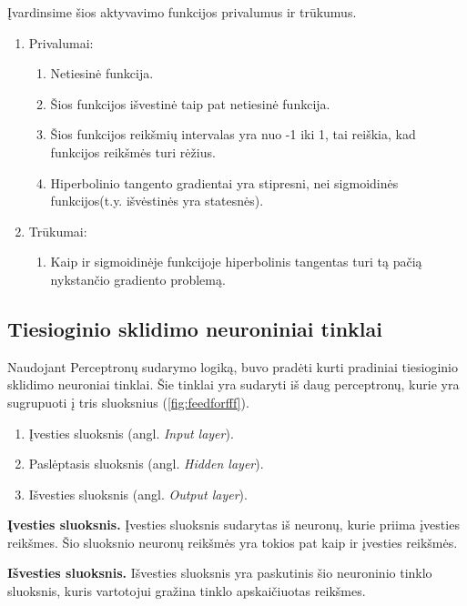 Įvardinsime šios aktyvavimo funkcijos privalumus ir trūkumus. \cite{Avinash2017}
\begin{enumerate}
  \item Privalumai:
    \begin{enumerate}
      \item Netiesinė funkcija.
      \item Šios funkcijos išvestinė taip pat netiesinė funkcija.
      \item Šios funkcijos reikšmių intervalas yra nuo -1 iki 1, tai reiškia, kad funkcijos reikšmės turi rėžius.
      \item Hiperbolinio tangento gradientai yra stipresni, nei sigmoidinės funkcijos(t.y. išvėstinės yra statesnės).
    \end{enumerate}
  \item Trūkumai:
    \begin{enumerate}
      \item Kaip ir sigmoidinėje funkcijoje hiperbolinis tangentas turi tą pačią nykstančio gradiento problemą.
    \end{enumerate}
\end{enumerate}


\subsection{Tiesioginio sklidimo neuroniniai tinklai}

Naudojant Perceptronų sudarymo logiką, buvo pradėti kurti pradiniai tiesioginio sklidimo neuroniai tinklai. Šie tinklai yra sudaryti iš daug perceptronų, kurie yra sugrupuoti į tris sluoksnius (\ref{fig:feedforfff}).
\begin{enumerate}
  \item Įvesties sluoksnis (angl. \textit{Input layer}).
  \item Paslėptasis sluoksnis (angl. \textit{Hidden layer}).
  \item Išvesties sluoksnis (angl. \textit{Output layer}).
\end{enumerate}

\textbf{Įvesties sluoksnis.} Įvesties sluoksnis sudarytas iš neuronų, kurie priima įvesties reikšmes. Šio sluoksnio neuronų reikšmės yra tokios pat kaip ir įvesties reikšmės. \cite{Sibanjan2017}

\textbf{Išvesties sluoksnis.} Išvesties sluoksnis yra paskutinis šio neuroninio tinklo sluoksnis, kuris vartotojui gražina tinklo apskaičiuotas reikšmes. \cite{Sibanjan2017}

